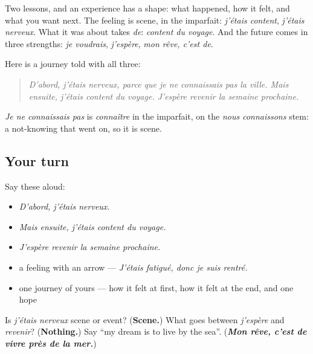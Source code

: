 \begin{grammarlens}[title={What you've built}]
Two lessons, and an experience has a shape: what happened, how it felt, and what you want next. The feeling is scene, in the imparfait: \emph{j'étais content}, \emph{j'étais nerveux}. What it was about takes \emph{de}: \emph{content du voyage}. And the future comes in three strengths: \emph{je voudrais}, \emph{j'espère}, \emph{mon rêve, c'est de}.

Here is a journey told with all three:

\begin{quote}
\emph{D'abord, j'étais nerveux, parce que je ne connaissais pas la ville. Mais ensuite, j'étais content du voyage. J'espère revenir la semaine prochaine.}
\end{quote}

\emph{Je ne connaissais pas} is \emph{connaître} in the imparfait, on the \emph{nous connaissons} stem: a not-knowing that went on, so it is scene.
\end{grammarlens}

\subsection*{Your turn}
Say these aloud:

\begin{itemize}
\raggedright
  \item \emph{D'abord, j'étais nerveux.}
  \item \emph{Mais ensuite, j'étais content du voyage.}
  \item \emph{J'espère revenir la semaine prochaine.}
  \item a feeling with an arrow — \emph{J'étais fatigué, donc je suis rentré.}
  \item one journey of yours — how it felt at first, how it felt at the end, and one hope
\end{itemize}

\begin{tcolorbox}[breakable,colback=teal!4,colframe=teal!35!black,title={Before you move on}]
Is \emph{j'étais nerveux} scene or event? (\textbf{Scene.}) What goes between \emph{j'espère} and \emph{revenir}? (\textbf{Nothing.}) Say \textquotedblleft{}my dream is to live by the sea\textquotedblright{}. (\emph{\textbf{Mon rêve, c'est de vivre près de la mer.}})
\end{tcolorbox}
